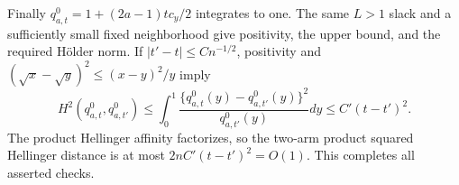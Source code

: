 Finally \(q_{a,t}^0=1+(2a-1)tc_y/2\) integrates to one. The same \(L>1\) slack and a sufficiently small fixed neighborhood give positivity, the upper bound, and the required H\"older norm. If \(|t'-t|\le Cn^{-1/2}\), positivity and \((\sqrt x-\sqrt y)^2\le(x-y)^2/y\) imply
\[
H^2(q_{a,t}^0,q_{a,t'}^0)
\le \int_0^1\frac{\{q_{a,t}^0(y)-q_{a,t'}^0(y)\}^2}{q_{a,t'}^0(y)}dy
\le C'(t-t')^2.                                      \tag{9}
\]
The product Hellinger affinity factorizes, so the two-arm product squared Hellinger distance is at most \(2nC'(t-t')^2=O(1)\). This completes all asserted checks.
